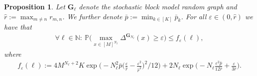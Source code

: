 \documentclass[a4paper,
               10pt,
               pdftex,
               normalheadings,
               headsepline,
               footsepline,
               headinclude,
               footinclude,
               DIV=14,
               abstracton]
{scrartcl}
\newtheorem{proposition}[theorem]{Proposition}
\newcommand{\rv}[1]{\bm{#1}}
\begin{document}
\begin{proposition}
Let $\rv{G}_{\ell}$ denote the stochastic block model random graph and $\hat{r} := \max_{m\neq n} r_{m,n}$.
We further denote $\bar{p} := \min_{k \in [K]} \bar{p}_k$.
For all $\varepsilon \in (0, \hat{r})$  we have that
\begin{align}
    \forall \ell \in \mathbb{N}:\ \mathbb{P}\Big(\max_{x\in [M]^{N_\ell}} \Delta^{\rv{G}_{N_\ell}}(x) \geq \varepsilon \Big) \leq f_\varepsilon(\ell),
\end{align}
where
\begin{align}
    f_\varepsilon(\ell) := 4 M^{N_\ell + 2} K \exp \Big( - N_\ell^2 \bar{p} \Big(\frac{\varepsilon}{\hat{r}} -  \frac{\varepsilon^2}{\hat{r}^2}\Big)^2 \big/ 12 \Big) + 2 N_\ell \exp\Big( -N_\ell \frac{\varepsilon^2 \bar{p}}{12 \hat{r}} + \frac{\varepsilon}{3 \hat{r}} \Big).
\end{align}
\end{proposition}
\end{document}

